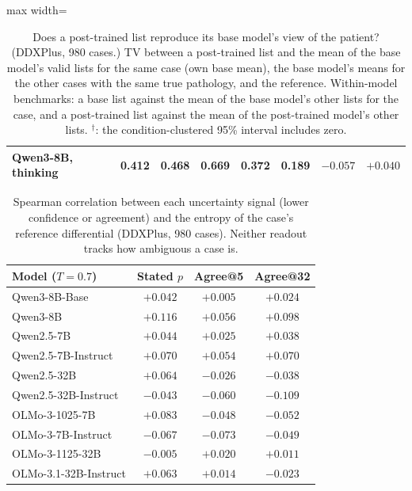 \documentclass[wcp]{jmlr}
\begin{document}
\begin{table}[t]
\begin{adjustbox}{max width=\linewidth}
\begin{tabular}{lccccccc}
Qwen3-8B, thinking & 0.412 & 0.468 & 0.669 & 0.372 & 0.189 & $-0.057$ & $+0.040$ \\
\bottomrule
\end{tabular}
\end{adjustbox}
\caption{Does a post-trained list reproduce its base model's view of the patient? (DDXPlus, 980 cases.) TV between a post-trained list and the mean of the base model's valid lists for the same case (own base mean), the base model's means for the other cases with the same true pathology, and the reference. Within-model benchmarks: a base list against the mean of the base model's other lists for the case, and a post-trained list against the mean of the post-trained model's other lists. $^{\dagger}$: the condition-clustered 95\% interval includes zero.}
\label{tab:packing}
\end{table}

\begin{table}[t]
\centering\small
\begin{tabular}{lccc}
\toprule
Model ($T{=}0.7$) & Stated $p$ & Agree@5 & Agree@32 \\
\midrule
Qwen3-8B-Base & $+0.042$ & $+0.005$ & $+0.024$ \\
Qwen3-8B & $+0.116$ & $+0.056$ & $+0.098$ \\
Qwen2.5-7B & $+0.044$ & $+0.025$ & $+0.038$ \\
Qwen2.5-7B-Instruct & $+0.070$ & $+0.054$ & $+0.070$ \\
Qwen2.5-32B & $+0.064$ & $-0.026$ & $-0.038$ \\
Qwen2.5-32B-Instruct & $-0.043$ & $-0.060$ & $-0.109$ \\
OLMo-3-1025-7B & $+0.083$ & $-0.048$ & $-0.052$ \\
OLMo-3-7B-Instruct & $-0.067$ & $-0.073$ & $-0.049$ \\
OLMo-3-1125-32B & $-0.005$ & $+0.020$ & $+0.011$ \\
OLMo-3.1-32B-Instruct & $+0.063$ & $+0.014$ & $-0.023$ \\
\bottomrule
\end{tabular}
\caption{Spearman correlation between each uncertainty signal (lower confidence or agreement) and the entropy of the case's reference differential (DDXPlus, 980 cases). Neither readout tracks how ambiguous a case is.}
\label{tab:ambiguity}
\end{table}
\end{document}
